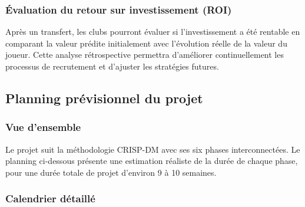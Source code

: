 \documentclass[12pt,a4paper]{article}
\begin{document}
\subsubsection{Évaluation du retour sur investissement (ROI)}

Après un transfert, les clubs pourront évaluer si l'investissement a été rentable en comparant la valeur prédite initialement avec l'évolution réelle de la valeur du joueur. Cette analyse rétrospective permettra d'améliorer continuellement les processus de recrutement et d'ajuster les stratégies futures.

\newpage

\subsection{Planning prévisionnel du projet}

\subsubsection{Vue d'ensemble}

Le projet suit la méthodologie CRISP-DM avec ses six phases interconnectées. Le planning ci-dessous présente une estimation réaliste de la durée de chaque phase, pour une durée totale de projet d'environ 9 à 10 semaines.

\subsubsection{Calendrier détaillé}
\end{document}
